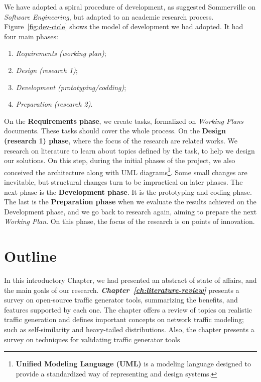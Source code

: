 We have adopted a spiral procedure of development, as suggested Sommerville on \textit{Software Engineering}\cite{sommerville}, but adapted to an academic research process. Figure~\ref{fig:dev-cicle} shows the model of development we had adopted. It had four main phases: 

\begin{enumerate}
    \item \textit{Requirements (working plan)};
    \item \textit{Design (research 1)};
    \item \textit{Development (prototyping/codding)};
    \item \textit{Preparation (research 2)}.
\end{enumerate}

On the \textbf{Requirements phase}, we create tasks,  formalized on \textit{Working Plans} documents.  These tasks should cover the whole process. On the \textbf{Design (research 1) phase}, where the focus of the research are related works. We research on literature to learn about topics defined by the task, to help we design our solutions. On this step, during the initial phases of the project,  we also conceived the architecture along with \acrshort{UML} diagrams\footnote{\textbf{Unified Modeling Language (UML)} is a modeling language designed to provide a standardized way of representing and design systems\cite{uml}.}. Some small changes are inevitable, but structural changes turn to be impractical on later phases. The next phase is the \textbf{Development phase}. It is the prototyping and coding phase.  The last is the \textbf{Preparation phase} when we evaluate the results achieved on the Development phase, and we go back to research again,  aiming to prepare the next \textit{Working Plan}.  On this phase, the focus of the research is on points of innovation.


\section{Outline}


In this introductory Chapter, we had presented an abstract of state of affairs, and the main goals of our research. \textit{\textbf{Chapter~\ref{ch:literature-review}}} presents a survey on open-source traffic generator tools, summarizing the benefits, and features supported by each one. The chapter offers a  review of topics on realistic traffic generation and defines important concepts on network traffic modeling; such as self-similarity and heavy-tailed distributions. Also, the chapter presents a survey on techniques for validating traffic generator tools 

